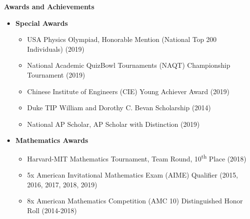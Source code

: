 \documentclass[letterpaper,11pt]{article}
\makeatletter
\newcommand{\resitem}[1]{\item #1 \vspace{-3pt}}
\newcommand{\resheading}[1]{{\large \colorbox{mygrey}{\begin{minipage}{\textwidth}{\textbf{#1 \vphantom{p\^{E}}}}\end{minipage}}}}
\newcommand{\ressubheading}[4]{
	\begin{tabular*}{7.0in}{l@{\extracolsep{\fill}}r}
			#1 & #2 \\
	\end{tabular*}
	\begin{tabular*}{7.0in}{l@{\extracolsep{\fill}}r}
			\textit{#3} & \textit{#4} \\
	\end{tabular*}\vspace{-6pt}}
\newcommand{\myitem}[1]{\item #1 \vspace{-9pt}}
\newcommand{\mysubitem}[1]{\item #1 \vspace{-4pt}}
\makeatother
\begin{document}
\begin{itemize}

\end{itemize}

\vspace{6pt}

\resheading{Awards and Achievements}
	\begin{itemize}
	
		
		\myitem {\textbf{Special Awards}}
			\begin{itemize}
				\mysubitem {USA Physics Olympiad, Honorable Mention (National Top 200 Individuals) (2019)}
				\mysubitem {National Academic QuizBowl Tournaments (NAQT) Championship Tournament (2019)}
				\mysubitem {Chinese Institute of Engineers (CIE) Young Achiever Award (2019)}
				\mysubitem {Duke TIP William and Dorothy C. Bevan Scholarship (2014)}
				\mysubitem {National AP Scholar, AP Scholar with Distinction (2019)}
			\end{itemize} \vspace{-9pt}
			
		\myitem {\textbf{Mathematics Awards}}
			\begin{itemize}
				\mysubitem {Harvard-MIT Mathematics Tournament, Team Round, 10\textsuperscript{th} Place (2018)}
				\mysubitem {5x American Invitational Mathematics Exam (AIME) Qualifier (2015, 2016, 2017, 2018, 2019)}
				\mysubitem {8x American Mathematics Competition (AMC 10) Distinguished Honor Roll (2014-2018)}
			\end{itemize} \vspace{-9pt}
			


\end{itemize}
\end{document}
